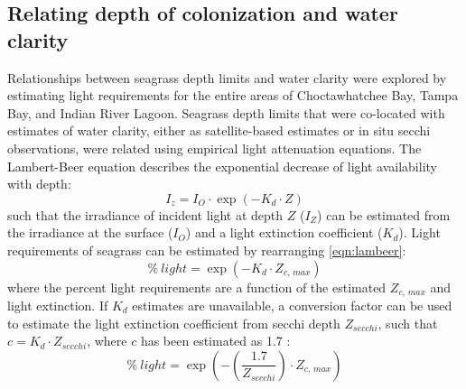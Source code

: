 \documentclass[letterpaper,12pt,oneside]{article}\usepackage[]{graphicx}\usepackage[]{color}
\begin{document}
\subsection{Relating depth of colonization and water clarity}

Relationships between seagrass depth limits and water clarity were explored by estimating light requirements for the entire areas of Choctawhatchee Bay, Tampa Bay, and Indian River Lagoon.  Seagrass depth limits that were co-located with estimates of water clarity, either as satellite-based estimates or in situ secchi observations, were related using empirical light attenuation equations.  The Lambert-Beer equation describes the exponential decrease of light availability with depth:
\begin{equation} \label{eqn:lambeer}
I_{z} = I_{O} \cdot \exp\left(-K_{d} \cdot Z\right)
\end{equation}
\noindent such that the irradiance of incident light at depth $Z$ ($I_{Z}$) can be estimated from the irradiance at the surface ($I_{O}$) and a light extinction coefficient ($K_{d}$). Light requirements of seagrass can be estimated by rearranging \cref{eqn:lambeer}:
\begin{equation} \label{eqn:perclight}
\% \ light = \exp\left(-K_{d} \cdot Z_{c,\,max}\right)
\end{equation}
\noindent where the percent light requirements are a function of the estimated $Z_{c,\,max}$ and light extinction. If $K_d$ estimates are unavailable, a conversion factor can be used to estimate the light extinction coefficient from secchi depth $Z_{secchi}$, such that $c = K_{d} \cdot Z_{secchi}$, where $c$ has been estimated as 1.7 \citep{Poole29,Idso74}:
\begin{equation} \label{eqn:cperclight}
\% \ light = \exp\left(-\left(\frac{1.7}{Z_{secchi}}\right)\cdot Z_{c,\,max}\right)
\end{equation}
\end{document}
